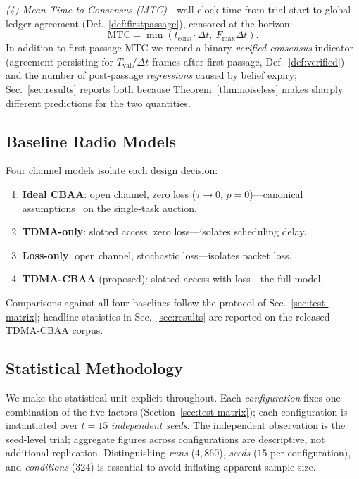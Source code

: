 \emph{(4) Mean Time to Consensus (MTC)}---wall-clock time from trial start to global ledger agreement (Def.~\ref{def:firstpassage}), censored at the horizon:
\begin{equation}
    \mathrm{MTC} = \min(t_{\mathrm{cons}} \cdot \Delta t,\ F_{\max}\Delta t).
    \label{eq:mtc}
\end{equation}
In addition to first-passage MTC we record a binary \emph{verified-consensus} indicator (agreement persisting for $T_{\mathrm{val}}/\Delta t$ frames after first passage, Def.~\ref{def:verified}) and the number of post-passage \emph{regressions} caused by belief expiry; Sec.~\ref{sec:results} reports both because Theorem~\ref{thm:noiseless} makes sharply different predictions for the two quantities.

\subsection{Baseline Radio Models}\label{sec:baselines}
Four channel models isolate each design decision:
\begin{enumerate}
    \item \textbf{Ideal CBAA}: open channel, zero loss ($\tau \to 0$, $p = 0$)---canonical assumptions~\cite{choi2009} on the single-task auction.
    \item \textbf{TDMA-only}: slotted access, zero loss---isolates scheduling delay.
    \item \textbf{Loss-only}: open channel, stochastic loss---isolates packet loss.
    \item \textbf{TDMA-CBAA} (proposed): slotted access with loss---the full model.
\end{enumerate}
Comparisons against all four baselines follow the protocol of Sec.~\ref{sec:test-matrix}; headline statistics in Sec.~\ref{sec:results} are reported on the released TDMA-CBAA corpus.

\subsection{Statistical Methodology}\label{sec:setup-stats}
We make the statistical unit explicit throughout. Each \emph{configuration} fixes one combination of the five factors (Section~\ref{sec:test-matrix}); each configuration is instantiated over $t = 15$ \emph{independent seeds}. The independent observation is the seed-level trial; aggregate figures across configurations are descriptive, not additional replication. Distinguishing \emph{runs} ($4{,}860$), \emph{seeds} ($15$ per configuration), and \emph{conditions} ($324$) is essential to avoid inflating apparent sample size.

